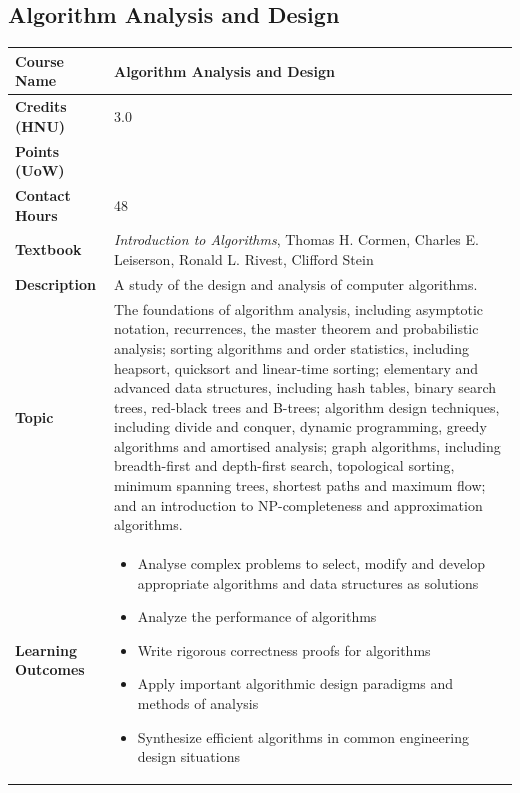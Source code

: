 \documentclass{article}
\begin{document}
\subsection{Algorithm Analysis and Design}
\renewcommand{\arraystretch}{1.5} %
\begin{longtable}{|p{3cm}|p{10cm}|}
\hline
\textbf{Course Name} & Algorithm Analysis and Design \\
\hline
\textbf{Credits (HNU)} & 3.0 \\
\hline
\textbf{Points (UoW)} & \\
\hline
\textbf{Contact Hours} & 48 \\
\hline
\textbf{Textbook} & \emph{Introduction to Algorithms}, Thomas H. Cormen, Charles E. Leiserson, Ronald L. Rivest, Clifford Stein \\
\hline
\textbf{Description} & A study of the design and analysis of computer algorithms. \\
\hline
\textbf{Topic} & The foundations of algorithm analysis, including asymptotic notation, recurrences, the master theorem and probabilistic analysis; sorting algorithms and order statistics, including heapsort, quicksort and linear-time sorting; elementary and advanced data structures, including hash tables, binary search trees, red-black trees and B-trees; algorithm design techniques, including divide and conquer, dynamic programming, greedy algorithms and amortised analysis; graph algorithms, including breadth-first and depth-first search, topological sorting, minimum spanning trees, shortest paths and maximum flow; and an introduction to NP-completeness and approximation algorithms. \\
\hline
\textbf{Learning Outcomes} & 
    \begin{itemize}
        \item Analyse complex problems to select, modify and develop appropriate algorithms and data structures as solutions
        \item Analyze the performance of algorithms
        \item Write rigorous correctness proofs for algorithms
        \item Apply important algorithmic design paradigms and methods of analysis
        \item Synthesize efficient algorithms in common engineering design situations
    \end{itemize} \\
\hline
\end{longtable}
\end{document}

